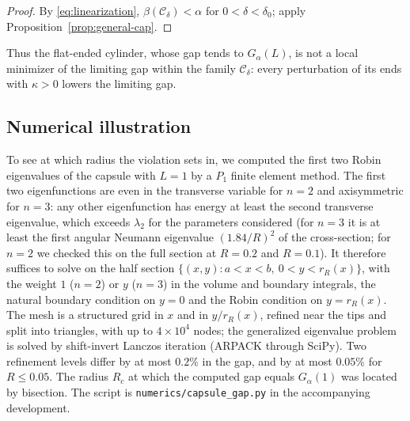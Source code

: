 \documentclass[11pt,a4paper]{article}
\numberwithin{equation}{section}
\theoremstyle{paperplain}
\theoremstyle{remark}
\newcommand{\C}{\mathcal{C}}
\newcommand{\lean}[1]{\texttt{#1}}
\begin{document}
\begin{proof}
By \eqref{eq:linearization}, $\beta(\C_\delta)<\alpha$ for
$0<\delta<\delta_0$; apply Proposition~\ref{prop:general-cap}.
\end{proof}

Thus the flat-ended cylinder, whose gap tends to $G_\alpha(L)$, is not a
local minimizer of the limiting gap within the family $\C_\delta$: every
perturbation of its ends with $\kappa>0$ lowers the limiting gap.

\subsection{Numerical illustration}\label{sec:numerics}
To see at which radius the violation sets in, we computed the first two Robin eigenvalues
of the capsule with $L=1$ by a $P_1$ finite element method. The first two
eigenfunctions are even in the transverse variable for $n=2$ and
axisymmetric for $n=3$: any other eigenfunction has energy at least the
second transverse eigenvalue, which exceeds $\lambda_2$ for the parameters
considered (for $n=3$ it is at least the first angular Neumann eigenvalue
$(1.84/R)^2$ of the cross-section; for $n=2$ we checked this on the full
section at $R=0.2$ and $R=0.1$).
It therefore suffices to solve on the half
section $\{(x,y):a<x<b,\ 0<y<r_R(x)\}$, with the weight $1$ ($n=2$) or $y$
($n=3$) in the volume and boundary integrals, the natural boundary condition
on $y=0$ and the Robin condition on $y=r_R(x)$. The mesh is a structured
grid in $x$ and in $y/r_R(x)$, refined near the tips and split into
triangles, with up to $4\times10^4$ nodes; the generalized eigenvalue
problem is solved by shift-invert Lanczos iteration (ARPACK through SciPy).
Two refinement levels differ by at most $0.2\%$ in the gap, and by at most
$0.05\%$ for $R\le0.05$. The radius $R_c$ at which the computed gap equals
$G_\alpha(1)$ was located by bisection. The script is
\lean{numerics/capsule\_gap.py} in the accompanying development.
\end{document}
